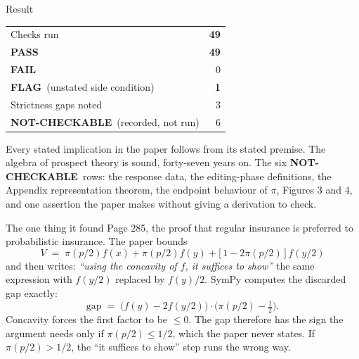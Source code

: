 \documentclass[aspectratio=169,11pt]{beamer}
\newcommand{\PASS}{{\color{okgreen}\bfseries PASS}}
\newcommand{\FAIL}{{\color{badred}\bfseries FAIL}}
\newcommand{\FLAG}{{\color{flagamber}\bfseries FLAG}}
\newcommand{\NC}{{\color{slate}\bfseries NOT-CHECKABLE}}
\begin{document}
\begin{frame}{Result}
  \begin{center}
  \begin{tabular}{@{}lr@{}}
    \toprule
    Checks run & \textbf{49} \\
    \PASS      & \textbf{49} \\
    \FAIL      & 0 \\
    \FLAG\ (unstated side condition) & \textbf{1} \\
    Strictness gaps noted & 3 \\
    \NC\ (recorded, not run) & 6 \\
    \bottomrule
  \end{tabular}
  \end{center}
  \vfill
  Every stated implication in the paper follows from its stated premise. The algebra of prospect
  theory is sound, forty-seven years on.
  \vfill
  {\color{slate} The six \NC\ rows: the response data, the editing-phase definitions, the Appendix
  representation theorem, the endpoint behaviour of $\pi$, Figures 3 and 4, and one assertion the
  paper makes without giving a derivation to check.}
\end{frame}

\begin{frame}{The one thing it found}
  Page 285, the proof that regular insurance is preferred to probabilistic insurance. The paper
  bounds
  \begin{equation*}
    V \;=\; \pi(p/2)f(x) + \pi(p/2)f(y) + \bigl[\,1 - 2\pi(p/2)\,\bigr]\,f(y/2)
  \end{equation*}
  and then writes: \emph{``using the concavity of $f$, it suffices to show''} the same expression
  with $f(y/2)$ replaced by $f(y)/2$.
  \vfill
  SymPy computes the discarded gap exactly:
  \begin{equation*}
    \text{gap} \;=\; \bigl(f(y) - 2f(y/2)\bigr)\cdot\bigl(\pi(p/2) - \tfrac12\bigr).
  \end{equation*}
  \vfill
  Concavity forces the first factor to be $\le 0$. The gap therefore has the sign the argument
  needs \alert{only if $\pi(p/2) \le 1/2$}, which the paper never states. If $\pi(p/2) > 1/2$, the
  ``it suffices to show'' step runs the wrong way.
\end{frame}
\end{document}
